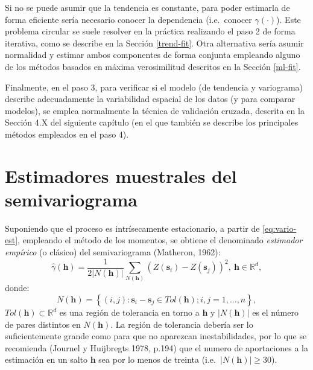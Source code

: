 \documentclass[
  spanish,
]{book}
\theoremstyle{break}
\theoremstyle{definition}
\theoremstyle{definition}
\theoremstyle{definition}
\theoremstyle{definition}
\theoremstyle{remark}
\begin{document}
Si no se puede asumir que la tendencia es constante, para poder estimarla de forma eficiente sería necesario conocer la dependencia (i.e.~conocer \(\gamma(\cdot)\)).
Este problema circular se suele resolver en la práctica realizando el paso 2 de forma iterativa, como se describe en la Sección \ref{trend-fit}.
Otra alternativa sería asumir normalidad y estimar ambos componentes de forma conjunta empleando alguno de los métodos basados en máxima verosimilitud descritos en la Sección \ref{ml-fit}.

Finalmente, en el paso 3, para verificar si el modelo (de tendencia y variograma) describe adecuadamente la variabilidad espacial de los datos (y para comparar modelos), se emplea normalmente la técnica de validación cruzada, descrita en la Sección 4.X del siguiente capítulo (en el que también se describe los principales métodos empleados en el paso 4).

\hypertarget{vario-muestrales}{%
\section{Estimadores muestrales del semivariograma}\label{vario-muestrales}}

Suponiendo que el proceso es intrísecamente estacionario, a partir de \eqref{eq:vario-est}, empleando el método de los momentos, se obtiene el denominado \emph{estimador empírico} (o clásico) del semivariograma (Matheron, 1962):
\[\hat{\gamma}(\mathbf{h}) = \dfrac{1}{2\left| N(\mathbf{h})\right| }
\sum\limits_{N(\mathbf{h})}\left( Z(\mathbf{s}_{i})-Z(\mathbf{s}_{j} )\right) ^2 ,\ \mathbf{h}\in \mathbb{R}^{d},\]
donde:
\[N(\mathbf{h}) = \left\{ (i,j):\mathbf{s}_{i} -\mathbf{s}_{j} \in Tol(\mathbf{h});i,j=1,\ldots,n\right\},\]
\(Tol(\mathbf{h})\subset \mathbb{R}^{d}\) es una región de tolerancia en torno a \(\mathbf{h}\) y \(\left| N(\mathbf{h})\right|\) es el número de pares distintos en \(N(\mathbf{h})\).
La región de tolerancia debería ser lo suficientemente grande como para que no aparezcan inestabilidades, por lo que se recomienda (Journel y Huijbregts 1978, p.194) que el numero de aportaciones a la estimación en un salto \(\mathbf{h}\) sea por lo menos de treinta (i.e.~\(\left| N(\mathbf{h})\right| \geq 30\)).
\end{document}
